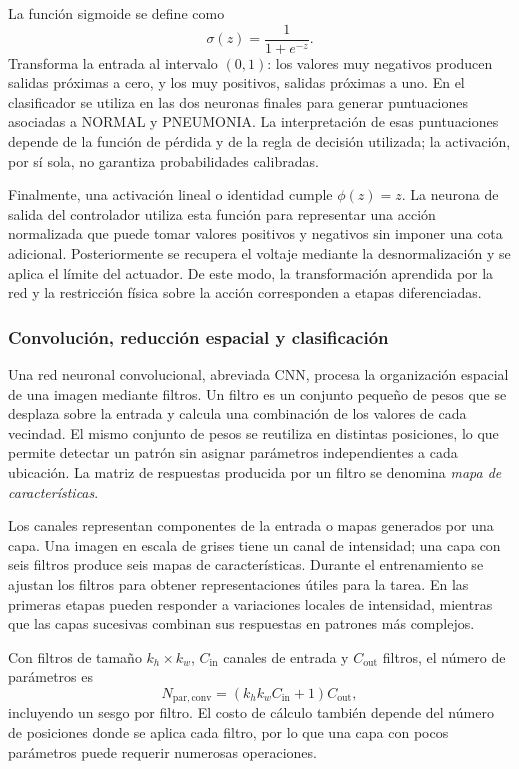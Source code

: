 La función sigmoide se define como
\begin{equation}
\sigma(z)=\frac{1}{1+e^{-z}}.
\end{equation}
Transforma la entrada al intervalo $(0,1)$: los valores muy negativos producen salidas próximas a cero, y los muy positivos, salidas próximas a uno. En el clasificador se utiliza en las dos neuronas finales para generar puntuaciones asociadas a NORMAL y PNEUMONIA. La interpretación de esas puntuaciones depende de la función de pérdida y de la regla de decisión utilizada; la activación, por sí sola, no garantiza probabilidades calibradas.

Finalmente, una activación lineal o identidad cumple $\phi(z)=z$. La neurona de salida del controlador utiliza esta función para representar una acción normalizada que puede tomar valores positivos y negativos sin imponer una cota adicional. Posteriormente se recupera el voltaje mediante la desnormalización y se aplica el límite del actuador. De este modo, la transformación aprendida por la red y la restricción física sobre la acción corresponden a etapas diferenciadas.

\subsubsection{Convolución, reducción espacial y clasificación}
Una red neuronal convolucional, abreviada CNN, procesa la organización espacial de una imagen mediante filtros. Un filtro es un conjunto pequeño de pesos que se desplaza sobre la entrada y calcula una combinación de los valores de cada vecindad. El mismo conjunto de pesos se reutiliza en distintas posiciones, lo que permite detectar un patrón sin asignar parámetros independientes a cada ubicación. La matriz de respuestas producida por un filtro se denomina \emph{mapa de características}.

Los canales representan componentes de la entrada o mapas generados por una capa. Una imagen en escala de grises tiene un canal de intensidad; una capa con seis filtros produce seis mapas de características. Durante el entrenamiento se ajustan los filtros para obtener representaciones útiles para la tarea. En las primeras etapas pueden responder a variaciones locales de intensidad, mientras que las capas sucesivas combinan sus respuestas en patrones más complejos.

Con filtros de tamaño $k_h\times k_w$, $C_{\mathrm{in}}$ canales de entrada y $C_{\mathrm{out}}$ filtros, el número de parámetros es
\begin{equation}
N_{\mathrm{par,conv}}=(k_hk_wC_{\mathrm{in}}+1)C_{\mathrm{out}},
\end{equation}
incluyendo un sesgo por filtro. El costo de cálculo también depende del número de posiciones donde se aplica cada filtro, por lo que una capa con pocos parámetros puede requerir numerosas operaciones.

